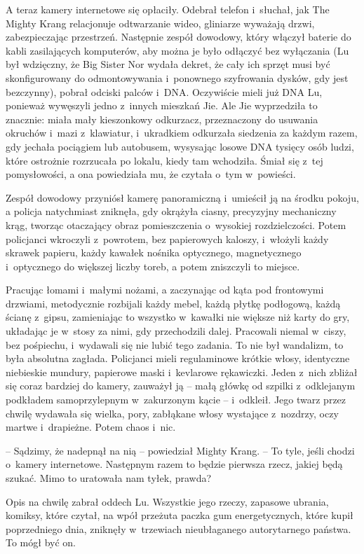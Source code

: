 \documentclass[oneside,polish,11pt,rmheadings]{mwbk}
\begin{document}
A teraz kamery internetowe się opłaciły. Odebrał telefon i~słuchał, jak The Mighty Krang relacjonuje odtwarzanie wideo, gliniarze wyważają drzwi, zabezpieczając przestrzeń. Następnie zespół dowodowy, który włączył baterie do kabli zasilających komputerów, aby można je było odłączyć bez wyłączania (Lu był wdzięczny, że Big Sister Nor wydała dekret, że cały ich sprzęt musi być skonfigurowany do odmontowywania i~ponownego szyfrowania dysków, gdy jest bezczynny), pobrał odciski palców i~DNA. Oczywiście mieli już DNA Lu, ponieważ wywęszyli jedno z~innych mieszkań Jie. Ale Jie wyprzedziła to znacznie: miała mały kieszonkowy odkurzacz, przeznaczony do usuwania okruchów i~mazi z~klawiatur, i~ukradkiem odkurzała siedzenia za każdym razem, gdy jechała pociągiem lub autobusem, wysysając losowe DNA tysięcy osób ludzi, które ostrożnie rozrzucała po lokalu, kiedy tam wchodziła. Śmiał się z~tej pomysłowości, a ona powiedziała mu, że czytała o~tym w~powieści.

Zespół dowodowy przyniósł kamerę panoramiczną i~umieścił ją na środku pokoju, a policja natychmiast zniknęła, gdy okrążyła ciasny, precyzyjny mechaniczny krąg, tworząc otaczający obraz pomieszczenia o~wysokiej rozdzielczości. Potem policjanci wkroczyli z~powrotem, bez papierowych kaloszy, i~włożyli każdy skrawek papieru, każdy kawałek nośnika optycznego, magnetycznego i~optycznego do większej liczby toreb, a potem zniszczyli to miejsce.

Pracując łomami i~małymi nożami, a zaczynając od kąta pod frontowymi drzwiami, metodycznie rozbijali każdy mebel, każdą płytkę podłogową, każdą ścianę z~gipsu, zamieniając to wszystko w~kawałki nie większe niż karty do gry, układając je w~stosy za nimi, gdy przechodzili dalej. Pracowali niemal w~ciszy, bez pośpiechu, i~wydawali się nie lubić tego zadania. To nie był wandalizm, to była absolutna zagłada. Policjanci mieli regulaminowe krótkie włosy, identyczne niebieskie mundury, papierowe maski i~kevlarowe rękawiczki. Jeden z~nich zbliżał się coraz bardziej do kamery, zauważył ją -- małą główkę od szpilki z~odklejanym podkładem samoprzylepnym w~zakurzonym kącie -- i~odkleił. Jego twarz przez chwilę wydawała się wielka, pory, zabłąkane włosy wystające z~nozdrzy, oczy martwe i~drapieżne. Potem chaos i~nic.

-- Sądzimy, że nadepnął na nią -- powiedział Mighty Krang. -- To tyle, jeśli chodzi o~kamery internetowe. Następnym razem to będzie pierwsza rzecz, jakiej będą szukać. Mimo to uratowała nam tyłek, prawda?

Opis na chwilę zabrał oddech Lu. Wszystkie jego rzeczy, zapasowe ubrania, komiksy, które czytał, na wpół przeżuta paczka gum energetycznych, które kupił poprzedniego dnia, zniknęły w~trzewiach nieubłaganego autorytarnego państwa. To mógł być on.
\end{document}

